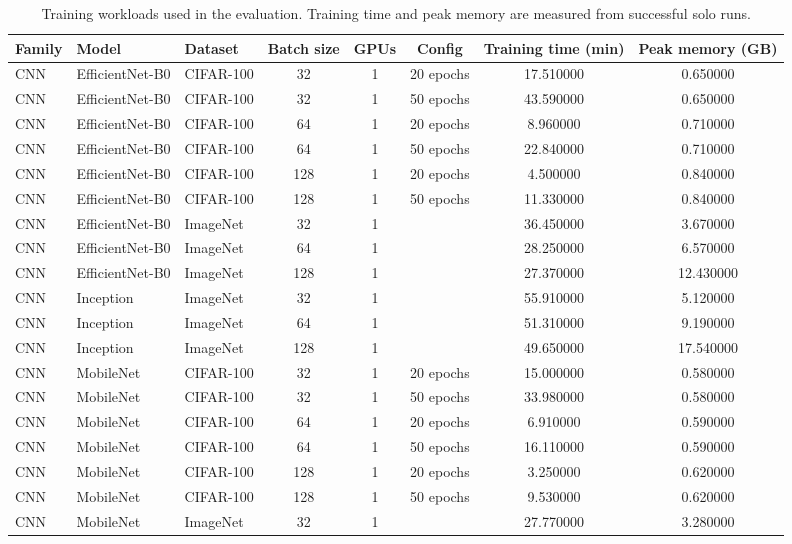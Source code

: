 \begin{table}
\caption{Training workloads used in the evaluation. Training time and peak memory are measured from successful solo runs.}
\label{tab:appendix-workloads}
\begin{tabular}{lllccccc}
\toprule
Family & Model & Dataset & Batch size & GPUs & Config & Training time (min) & Peak memory (GB) \\
\midrule
CNN & EfficientNet-B0 & CIFAR-100 & 32 & 1 & 20 epochs & 17.510000 & 0.650000 \\
CNN & EfficientNet-B0 & CIFAR-100 & 32 & 1 & 50 epochs & 43.590000 & 0.650000 \\
CNN & EfficientNet-B0 & CIFAR-100 & 64 & 1 & 20 epochs & 8.960000 & 0.710000 \\
CNN & EfficientNet-B0 & CIFAR-100 & 64 & 1 & 50 epochs & 22.840000 & 0.710000 \\
CNN & EfficientNet-B0 & CIFAR-100 & 128 & 1 & 20 epochs & 4.500000 & 0.840000 \\
CNN & EfficientNet-B0 & CIFAR-100 & 128 & 1 & 50 epochs & 11.330000 & 0.840000 \\
CNN & EfficientNet-B0 & ImageNet & 32 & 1 &  & 36.450000 & 3.670000 \\
CNN & EfficientNet-B0 & ImageNet & 64 & 1 &  & 28.250000 & 6.570000 \\
CNN & EfficientNet-B0 & ImageNet & 128 & 1 &  & 27.370000 & 12.430000 \\
CNN & Inception & ImageNet & 32 & 1 &  & 55.910000 & 5.120000 \\
CNN & Inception & ImageNet & 64 & 1 &  & 51.310000 & 9.190000 \\
CNN & Inception & ImageNet & 128 & 1 &  & 49.650000 & 17.540000 \\
CNN & MobileNet & CIFAR-100 & 32 & 1 & 20 epochs & 15.000000 & 0.580000 \\
CNN & MobileNet & CIFAR-100 & 32 & 1 & 50 epochs & 33.980000 & 0.580000 \\
CNN & MobileNet & CIFAR-100 & 64 & 1 & 20 epochs & 6.910000 & 0.590000 \\
CNN & MobileNet & CIFAR-100 & 64 & 1 & 50 epochs & 16.110000 & 0.590000 \\
CNN & MobileNet & CIFAR-100 & 128 & 1 & 20 epochs & 3.250000 & 0.620000 \\
CNN & MobileNet & CIFAR-100 & 128 & 1 & 50 epochs & 9.530000 & 0.620000 \\
CNN & MobileNet & ImageNet & 32 & 1 &  & 27.770000 & 3.280000 \\

\end{tabular}
\end{table}

